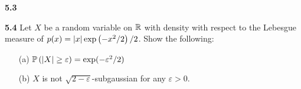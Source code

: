 






\noindent\textbf{5.3}



\noindent\textbf{5.4} Let $X$ be a random variable on $\mathbb{R}$ with density with respect to the Lebesgue measure of $p(x)= \left| x \right|\exp\left(-x^2/2\right)/2$. Show the following:
\begin{enumerate}
	\item[(a)] $\mathbb{P} \left(\left| X \right|\ge \varepsilon\right) = \exp(-\varepsilon^2/2)$
	\item[(b)] $X$ is not $\sqrt{2-\varepsilon}$-subgaussian for any $\varepsilon>0$.
\end{enumerate}

